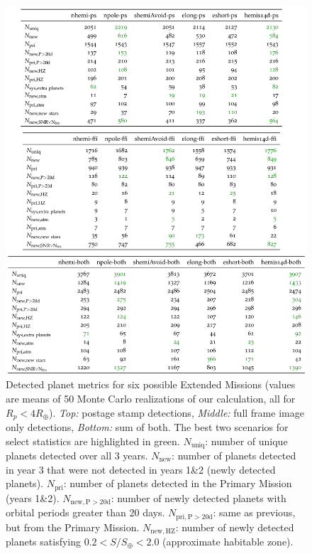 \begin{figure}[!t]
	\centering
	\includegraphics[scale=2.]{tables/160729_t50_with_earth_moon_Deming_corr.pdf}
	\caption{Detected planet metrics for six possible Extended Missions (values are means of 50 Monte Carlo realizations of our calculation, all for $R_p<4R_\oplus$).
	\textit{Top:} postage stamp detections, \textit{Middle:} full frame image only detections, \textit{Bottom:} sum of both.
	The best two scenarios for select statistics are highlighted in green.
	\newline
	$N_\mathrm{uniq}$: number of unique planets detected over all 3 years.
	$N_\mathrm{new}$: number of planets detected in year 3 that were not detected in years 1\&2 (newly detected planets).
	$N_\mathrm{pri}$: number of planets detected in the Primary Mission (years 1\&2).
	$N_\mathrm{new,P>20d}$: number of newly detected planets with orbital periods greater than 20 days.
	$N_\mathrm{pri,P>20d}$: same as previous, but from the Primary Mission.
	$N_\mathrm{new,HZ}$: number of newly detected planets satisfying $0.2<S/S_\oplus<2.0$ (approximate habitable zone).
}
\end{figure}
